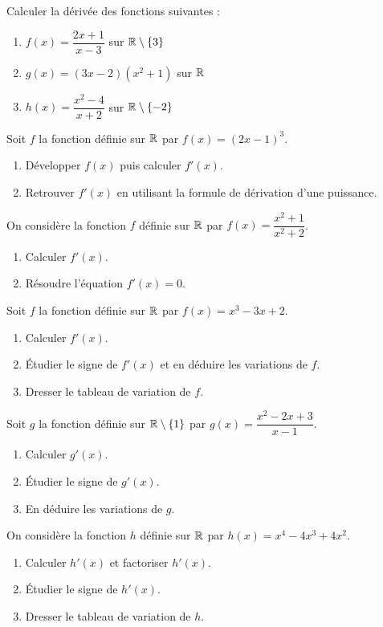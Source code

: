 \exo{}
Calculer la dérivée des fonctions suivantes :
\begin{enumerate}[label=\alph*)]
\item $f(x)=\dfrac{2x+1}{x-3}$ sur $\mathbb{R}\setminus\{3\}$
\item $g(x)=(3x-2)(x^2+1)$ sur $\mathbb{R}$
\item $h(x)=\dfrac{x^2-4}{x+2}$ sur $\mathbb{R}\setminus\{-2\}$
\end{enumerate}

\exo{}
Soit $f$ la fonction définie sur $\mathbb{R}$ par $f(x)=(2x-1)^3$.
\begin{enumerate}[label=\alph*)]
\item Développer $f(x)$ puis calculer $f'(x)$.
\item Retrouver $f'(x)$ en utilisant la formule de dérivation d'une puissance.
\end{enumerate}

\exo{}
On considère la fonction $f$ définie sur $\mathbb{R}$ par $f(x)=\dfrac{x^2+1}{x^2+2}$.
\begin{enumerate}[label=\alph*)]
\item Calculer $f'(x)$.
\item Résoudre l'équation $f'(x)=0$.
\end{enumerate}


\exo{}
Soit $f$ la fonction définie sur $\mathbb{R}$ par $f(x)=x^3-3x+2$.
\begin{enumerate}[label=\alph*)]
\item Calculer $f'(x)$.
\item Étudier le signe de $f'(x)$ et en déduire les variations de $f$.
\item Dresser le tableau de variation de $f$.
\end{enumerate}

\exo{}
Soit $g$ la fonction définie sur $\mathbb{R}\setminus\{1\}$ par $g(x)=\dfrac{x^2-2x+3}{x-1}$.
\begin{enumerate}[label=\alph*)]
\item Calculer $g'(x)$.
\item Étudier le signe de $g'(x)$.
\item En déduire les variations de $g$.
\end{enumerate}

\exo{}
On considère la fonction $h$ définie sur $\mathbb{R}$ par $h(x)=x^4-4x^3+4x^2$.
\begin{enumerate}[label=\alph*)]
\item Calculer $h'(x)$ et factoriser $h'(x)$.
\item Étudier le signe de $h'(x)$.
\item Dresser le tableau de variation de $h$.
\end{enumerate}

